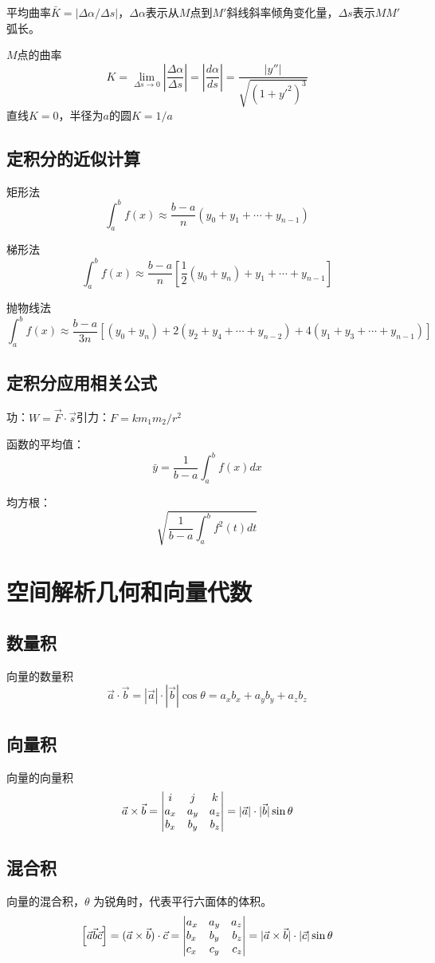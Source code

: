 \documentclass[a4paper,zihao=-4,UTF8]{ctexbook}
\begin{document}
平均曲率$\bar{K}=|\Delta\alpha/\Delta s|$，$\Delta\alpha $表示从$M$点到$M'$斜线斜率倾角变化量，$\Delta s$表示$MM'$弧长。

$M$点的曲率
\[K=\lim_{\Delta s\to 0}\left| \frac{\Delta \alpha}{\Delta s}\right|=\left| \frac{d \alpha}{d s}\right|=\frac{|y''|}{\sqrt{(1+y'^2)^3}}
\]
直线$K=0$，半径为$a$的圆$K= 1/a$
\subsection{定积分的近似计算}
矩形法
\[
\int_{a}^{b} f(x) \approx \frac{b-a}{n}\left(y_{0}+y_{1}+\cdots+y_{n-1}\right)
\]

梯形法
\[
\int_{a}^{b} f(x) \approx \frac{b-a}{n}\left[\frac{1}{2}\left(y_{0}+y_{n}\right)+y_{1}+\cdots+y_{n-1}\right]
\]

抛物线法
\[
\int_{a}^{b} f(x) \approx \frac{b-a}{3 n}\left[\left(y_{0}+y_{n}\right)+2\left(y_{2}+y_{4}+\cdots+y_{n-2}\right)+4\left(y_{1}+y_{3}+\cdots+y_{n-1}\right)\right]
\]
\subsection{定积分应用相关公式}
功：$W=\vec{F}\cdot\vec{s}$\quad 引力：$F=k{m_1m_2}/{r^2}$

函数的平均值：\[\bar{y}=\frac{1}{b-a}\int_a^bf(x)dx\]

均方根：\[\sqrt{\frac{1}{b-a}\int_a^b f^2(t)dt}\]
\section{空间解析几何和向量代数}
\subsection{数量积}
向量的数量积\[\vec{a}\cdot\vec{b}=|\vec{a}|\cdot|\vec{b}|\cos\theta=
a_xb_x+a_yb_y+a_zb_z\]
\subsection{向量积}
向量的向量积
\[\vec{a}\times\vec{b}=\left|\begin{array}{@{}ccc@{}}
    i&j&k\\
    a_x&a_y&a_z\\
    b_x&b_y&b_z\\
\end{array}\right|=|\vec{a}|\cdot|\vec{b}|\sin\theta\]
\subsection{混合积}
向量的混合积，$\theta$ 为锐角时，代表平行六面体的体积。
\[\left[\vec{a}\vec{b}\vec{c}\right]=(\vec{a}\times\vec{b})\cdot\vec{c}=\left|
\begin{array}{@{}lcr@{}}
    a_x&a_y&a_z\\
    b_x&b_y&b_z\\
    c_x&c_y&c_z\\
\end{array}
\right|=|\vec{a}\times\vec{b}|\cdot|\vec{c}|\sin\theta\]
\end{document}
